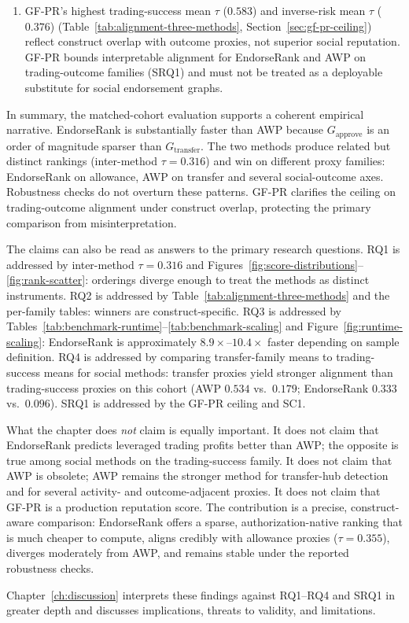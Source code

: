 \begin{enumerate}
\item[\textbf{SC1.}] GF-PR's highest trading-success mean $\tau$ ($0.583$) and inverse-risk mean $\tau$ ($0.376$) (Table~\ref{tab:alignment-three-methods}, Section~\ref{sec:gf-pr-ceiling}) reflect construct overlap with outcome proxies, not superior social reputation. GF-PR bounds interpretable alignment for EndorseRank and AWP on trading-outcome families (SRQ1) and must not be treated as a deployable substitute for social endorsement graphs.
\end{enumerate}

In summary, the matched-cohort evaluation supports a coherent empirical narrative. EndorseRank is substantially faster than AWP because $G_{\text{approve}}$ is an order of magnitude sparser than $G_{\text{transfer}}$. The two methods produce related but distinct rankings (inter-method $\tau=0.316$) and win on different proxy families: EndorseRank on allowance, AWP on transfer and several social-outcome axes. Robustness checks do not overturn these patterns. GF-PR clarifies the ceiling on trading-outcome alignment under construct overlap, protecting the primary comparison from misinterpretation.

The claims can also be read as answers to the primary research questions. RQ1 is addressed by inter-method $\tau=0.316$ and Figures~\ref{fig:score-distributions}--\ref{fig:rank-scatter}: orderings diverge enough to treat the methods as distinct instruments. RQ2 is addressed by Table~\ref{tab:alignment-three-methods} and the per-family tables: winners are construct-specific. RQ3 is addressed by Tables~\ref{tab:benchmark-runtime}--\ref{tab:benchmark-scaling} and Figure~\ref{fig:runtime-scaling}: EndorseRank is approximately $8.9\times$--$10.4\times$ faster depending on sample definition. RQ4 is addressed by comparing transfer-family means to trading-success means for social methods: transfer proxies yield stronger alignment than trading-success proxies on this cohort (AWP $0.534$ vs.\ $0.179$; EndorseRank $0.333$ vs.\ $0.096$). SRQ1 is addressed by the GF-PR ceiling and SC1.

What the chapter does \emph{not} claim is equally important. It does not claim that EndorseRank predicts leveraged trading profits better than AWP; the opposite is true among social methods on the trading-success family. It does not claim that AWP is obsolete; AWP remains the stronger method for transfer-hub detection and for several activity- and outcome-adjacent proxies. It does not claim that GF-PR is a production reputation score. The contribution is a precise, construct-aware comparison: EndorseRank offers a sparse, authorization-native ranking that is much cheaper to compute, aligns credibly with allowance proxies ($\tau=0.355$), diverges moderately from AWP, and remains stable under the reported robustness checks.

Chapter~\ref{ch:discussion} interprets these findings against RQ1--RQ4 and SRQ1 in greater depth and discusses implications, threats to validity, and limitations.
